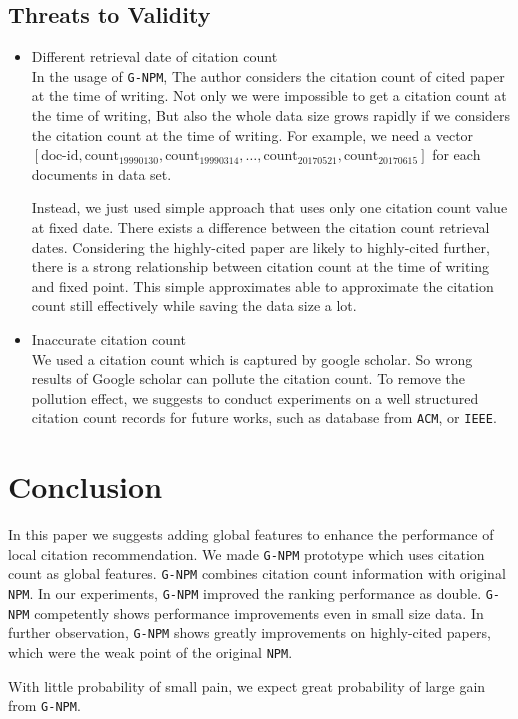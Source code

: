 \documentclass{llncs}
\newcommand{\name}{\texttt{G-NPM}\xspace}
\newcommand{\npm}{\texttt{NPM}\xspace}
\begin{document}
\subsection{Threats to Validity}

\begin{itemize}
\item Different retrieval date of citation count\\
In the usage of \name, The author considers the citation count of cited paper at the time of writing. Not only we were impossible to get a citation count at the time of writing, But also the whole data size grows rapidly if we considers the citation count at the time of writing.  For example, we need a vector $[\text{doc-id}, \text{count}_{19990130}, \text{count}_{19990314}, \dots, \text{count}_{20170521}, \text{count}_{20170615}]$ for each documents in data set.

Instead, we just used simple approach that uses only one citation count value at fixed date. There exists a difference between the citation count retrieval dates. Considering the highly-cited paper are likely to highly-cited further, there is a strong relationship between citation count at the time of writing and fixed point. This simple approximates able to approximate the citation count still effectively while saving the data size a lot.\\

\item Inaccurate citation count\\
We used a citation count which is captured by google scholar. So wrong results of Google scholar can pollute the citation count. To remove the pollution effect, we suggests to conduct experiments on a well structured citation count records for future works, such as database from \texttt{ACM}, or \texttt{IEEE}.
\end{itemize}



\section{Conclusion}
\label{sec:Conclusion}

In this paper we suggests adding global features to enhance the performance of local citation recommendation. We made \name prototype which uses citation count as global features. \name combines citation count information with original \npm. In our experiments, \name improved the ranking performance as double. \name competently shows performance improvements even in small size data. In further observation, \name shows greatly improvements on highly-cited papers, which were the weak point of the original \npm.

With little probability of small pain, we expect great probability of large gain from \name.





\end{document}
